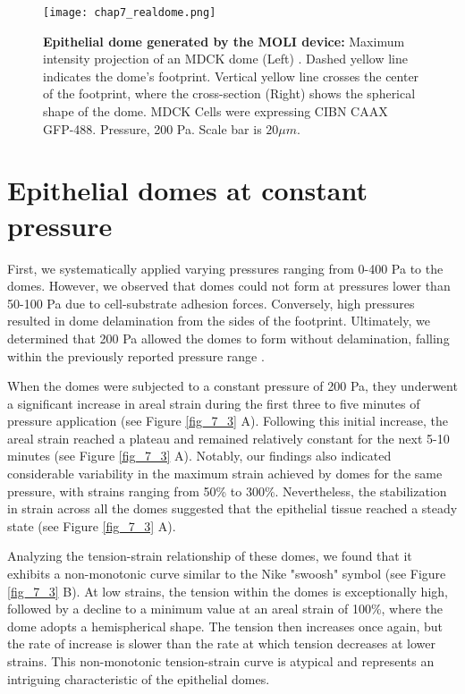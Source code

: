 \begin{figure}
	\centering
	\texttt{[image: chap7\_realdome.png]}
	\caption{\textbf{Epithelial dome generated by the MOLI device:} Maximum intensity projection of an MDCK dome (Left) . Dashed yellow line indicates the dome's footprint. Vertical yellow line crosses the center of the footprint, where the cross-section   (Right) shows the spherical shape of the dome. MDCK Cells were expressing CIBN CAAX GFP-488. Pressure, 200 Pa. Scale bar is $20 \mu m$.
	} \label{fig_7_1}
\end{figure}

\hypertarget{epithelial-domes-at-constant-pressure}{%
	\section{Epithelial domes at constant
		pressure}\label{epithelial-domes-at-constant-pressure}}

First, we systematically applied varying pressures ranging from 0-400 \unit{\pascal} to the domes. However, we observed that domes could not form at pressures lower than 50-100 \unit{\pascal} due to cell-substrate adhesion forces. Conversely, high pressures resulted in dome delamination from the sides of the footprint. Ultimately, we determined that 200 \unit{\pascal} allowed the domes to form without delamination, falling within the previously reported pressure range  \cite{choudhury2022,marin-llaurado2022}.

When the domes were subjected to a constant pressure of 200 \unit{\pascal}, they underwent a significant increase in areal strain during the first three to five minutes of pressure application (see Figure \ref{fig_7_3} A). Following this initial increase, the areal strain reached a plateau and remained relatively constant for the next 5-10 minutes (see Figure \ref{fig_7_3} A). Notably, our findings also indicated considerable variability in the maximum strain achieved by domes for the same pressure, with strains ranging from 50\% to 300\%. Nevertheless, the stabilization in strain across all the domes suggested that the epithelial tissue reached a steady state (see Figure \ref{fig_7_3} A).

Analyzing the tension-strain relationship of these domes, we found that it exhibits a non-monotonic curve similar to the Nike "swoosh" symbol (see Figure \ref{fig_7_3} B). At low strains, the tension within the domes is exceptionally high, followed by a decline to a minimum value at an areal strain of 100\%, where the dome adopts a hemispherical shape. The tension then increases once again, but the rate of increase is slower than the rate at which tension decreases at lower strains. This non-monotonic tension-strain curve is atypical and represents an intriguing characteristic of the epithelial domes.

